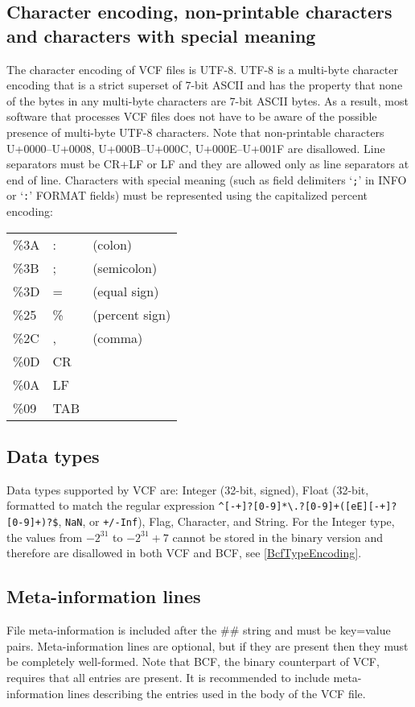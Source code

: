 \documentclass[8pt]{article}
\begin{document}
\subsection{Character encoding, non-printable characters and characters with special meaning}
\label{character-encoding}
The character encoding of VCF files is UTF-8.
UTF-8 is a multi-byte character encoding that is a strict superset of 7-bit ASCII and has the property that none of the bytes in any multi-byte characters are 7-bit ASCII bytes.
As a result, most software that processes VCF files does not have to be aware of the possible presence of multi-byte UTF-8 characters.
Note that non-printable characters U+0000--U+0008, U+000B--U+000C, U+000E--U+001F are disallowed.
Line separators must be CR+LF or LF and they are allowed only as line separators at end of line.
Characters with special meaning (such as field delimiters `\verb|;|' in INFO or `\verb|:|' FORMAT fields) must be represented using the capitalized percent encoding:

\begingroup\footnotesize
\begin{tabular}{l l l}
\%3A  &  :  & (colon)                \\
\%3B  &  ;  & (semicolon)            \\
\%3D  &  =  & (equal sign)           \\
\%25  &  \% & (percent sign)         \\
\%2C  &  ,  & (comma)                \\
\%0D  & CR  &                        \\
\%0A  & LF  &                        \\
\%09  & TAB & 
\end{tabular}
\endgroup


\subsection{Data types}
Data types supported by VCF are: Integer (32-bit, signed), Float (32-bit, formatted to match the regular expression \verb|^[-+]?[0-9]*\.?[0-9]+([eE][-+]?[0-9]+)?$|, \texttt{NaN}, or \texttt{+/-Inf}), Flag, Character, and String.
For the Integer type, the values from $-2^{31}$ to $-2^{31}+7$ cannot be stored in the binary version and therefore are disallowed in both VCF and BCF, see \ref{BcfTypeEncoding}.

\subsection{Meta-information lines}
File meta-information is included after the \#\# string and must be key=value pairs.
Meta-information lines are optional, but if they are present then they must be completely well-formed.
Note that BCF, the binary counterpart of VCF, requires that all entries are present.
It is recommended to include meta-information lines describing the entries used in the body of the VCF file.
\end{document}
